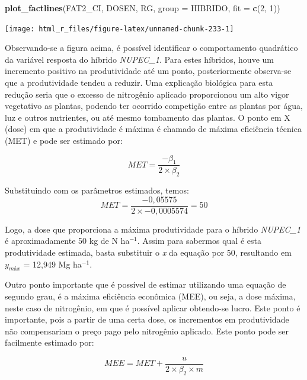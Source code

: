 \documentclass[
]{book}
\newenvironment{Shaded}{\begin{snugshade}}{\end{snugshade}}
\newcommand{\DataTypeTok}[1]{\textcolor[rgb]{0.13,0.29,0.53}{#1}}
\newcommand{\DecValTok}[1]{\textcolor[rgb]{0.00,0.00,0.81}{#1}}
\newcommand{\KeywordTok}[1]{\textcolor[rgb]{0.13,0.29,0.53}{\textbf{#1}}}
\newcommand{\NormalTok}[1]{#1}
\begin{document}
\begin{Shaded}
\begin{Highlighting}[]
\KeywordTok{plot_factlines}\NormalTok{(FAT2_CI, DOSEN, RG,}
               \DataTypeTok{group =}\NormalTok{ HIBRIDO,}
               \DataTypeTok{fit =} \KeywordTok{c}\NormalTok{(}\DecValTok{2}\NormalTok{, }\DecValTok{1}\NormalTok{))}
\end{Highlighting}
\end{Shaded}

\begin{center}\texttt{[image: html\_r\_files/figure-latex/unnamed-chunk-233-1]} \end{center}

Observando-se a figura acima, é possível identificar o comportamento quadrático da variável resposta do híbrido \emph{NUPEC\_1}. Para estes híbridos, houve um incremento positivo na produtividade até um ponto, posteriormente observa-se que a produtividade tendeu a reduzir. Uma explicação biológica para esta redução seria que o excesso de nitrogênio aplicado proporcionou um alto vigor vegetativo as plantas, podendo ter ocorrido competição entre as plantas por água, luz e outros nutrientes, ou até mesmo tombamento das plantas. O ponto em X (dose) em que a produtividade é máxima é chamado de máxima eficiência técnica (MET) e pode ser estimado por: 

\[
MET = \frac{{ - {\beta _1}}}{{2 \times {\beta _2}}}
\]

Substituindo com os parâmetros estimados, temos:
\[
MET = \frac{{ - 0,05575}}{{2 \times  -0,0005574}} = 50
\]

Logo, a dose que proporciona a máxima produtividade para o híbrido \emph{NUPEC\_1} é aproximadamente 50 kg de N ha\(^{-1}\). Assim para sabermos qual é esta produtividade estimada, basta substituir o \emph{x} da equação por 50, resultando em \(y_{máx}\) = 12,949 Mg ha\(^{-1}\).

Outro ponto importante que é possível de estimar utilizando uma equação de segundo grau, é a máxima eficiência econômica (MEE), ou seja, a dose máxima, neste caso de nitrogênio, em que é possível aplicar obtendo-se lucro. Este ponto é importante, pois a partir de uma certa dose, os incrementos em produtividade não compensariam o preço pago pelo nitrogênio aplicado. Este ponto pode ser facilmente estimado por:

\[
MEE = MET + \frac{u}{{2 \times \beta_2 \times m}}
\]
\end{document}
